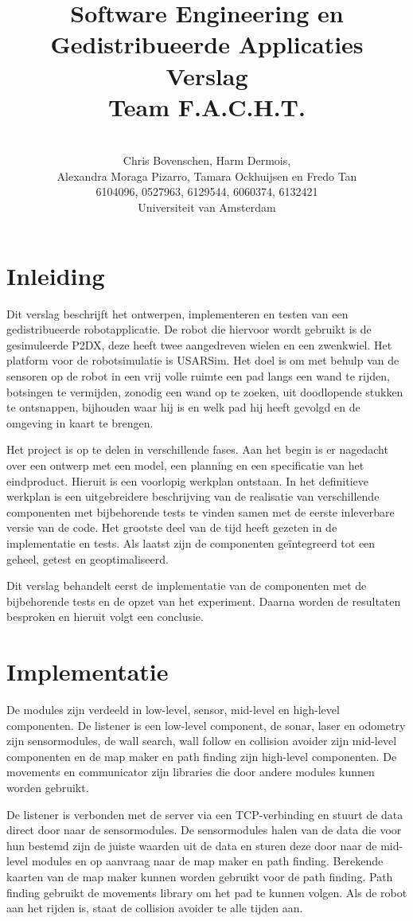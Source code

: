 \documentclass[a4paper,10pt]{article}
\title{Software Engineering en Gedistribueerde Applicaties \\[10pt]Verslag\\[25pt]Team F.A.C.H.T.}
\author{\\Chris Bovenschen, Harm Dermois, \\Alexandra Moraga Pizarro, Tamara Ockhuijsen en Fredo Tan \\[10pt]6104096, 0527963, 6129544, 6060374, 6132421 \\[25pt]Universiteit van Amsterdam}
\begin{document}
\maketitle

\newpage
\tableofcontents

\newpage
\section{Inleiding}
Dit verslag beschrijft het ontwerpen, implementeren en testen van een gedistribueerde robotapplicatie. De robot die hiervoor wordt gebruikt is de gesimuleerde P2DX, deze heeft twee aangedreven wielen en een zwenkwiel. Het platform voor de robotsimulatie is USARSim. Het doel is om met behulp van de sensoren op de robot in een vrij volle ruimte een pad langs een wand te rijden, botsingen te vermijden, zonodig een wand op te zoeken, uit doodlopende stukken te ontsnappen, bijhouden waar hij is en welk pad hij heeft gevolgd en de omgeving in kaart te brengen. 

Het project is op te delen in verschillende fases. Aan het begin is er nagedacht over een ontwerp met een model, een planning en een specificatie van het eindproduct. Hieruit is een voorlopig werkplan ontstaan. In het definitieve werkplan is een uitgebreidere beschrijving van de realisatie van verschillende componenten met bijbehorende tests te vinden samen met de eerste inleverbare versie van de code. Het grootste deel van de tijd heeft gezeten in de implementatie en tests. Als laatst zijn de componenten ge\"{i}ntegreerd tot een geheel, getest en geoptimaliseerd.

Dit verslag behandelt eerst de implementatie van de componenten met de bijbehorende tests en de opzet van het experiment. Daarna worden de resultaten besproken en hieruit volgt een conclusie.

\newpage

\section{Implementatie}
De modules zijn verdeeld in low-level, sensor, mid-level en high-level componenten. De listener is een low-level component, de sonar, laser en odometry zijn sensormodules, de wall search, wall follow en collision avoider zijn mid-level componenten en de map maker en path finding zijn high-level componenten. De movements en communicator zijn libraries die door andere modules kunnen worden gebruikt. 

De listener is verbonden met de server via een TCP-verbinding en stuurt de data direct door naar de sensormodules. De sensormodules halen van de data die voor hun bestemd zijn de juiste waarden uit de data en sturen deze door naar de mid-level modules en op aanvraag naar de map maker en path finding. Berekende kaarten van de map maker kunnen worden gebruikt voor de path finding. Path finding gebruikt de movements library om het pad te kunnen volgen. Als de robot aan het rijden is, staat de collision avoider te alle tijden aan.
\end{document}
